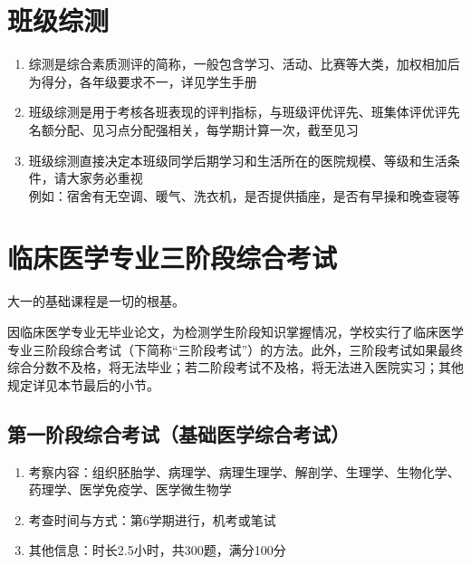 \section[班级综测]{班级综测}
\label{class_evaluation}
\begin{enumerate}
    \item 综测是综合素质测评的简称，一般包含学习、活动、比赛等大类，加权相加后为得分，各年级要求不一，详见学生手册
    \item 班级综测是用于考核各班表现的评判指标，与班级评优评先、班集体评优评先名额分配、见习点分配\footnotemark 强相关，每学期计算一次，截至见习
    \item 班级综测直接决定本班级同学后期学习和生活所在的医院规模、等级和生活条件，请大家务必重视\\
          例如：宿舍有无空调、暖气、洗衣机，是否提供插座，是否有早操和晚查寝\footnotemark 等
\end{enumerate}

\section[临床医学专业三阶段综合考试]{临床医学专业三阶段综合考试}
大一的基础课程是一切的根基。

因临床医学专业无毕业论文，为检测学生阶段知识掌握情况，学校实行了临床医学专业三阶段综合考试（下简称“三阶段考试”）的方法。此外，三阶段考试如果最终综合分数不及格，将无法毕业；若二阶段考试不及格，将无法进入医院实习；其他规定详见本节最后的小节。

\subsection[第一阶段综合考试（基础医学综合考试）]{第一阶段综合考试（基础医学综合考试）}
\begin{enumerate}
    \item 考察内容：组织胚胎学、病理学、病理生理学、解剖学、生理学、生物化学、药理学、医学免疫学、医学微生物学
    \item 考查时间与方式：第6学期进行，机考或笔试
    \item 其他信息：时长2.5小时，共300题，满分100分
\end{enumerate}


